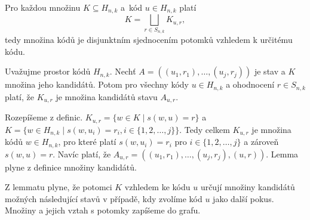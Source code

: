 \begin{lemma}\label{lemmadisjunktnipotomci}
    Pro každou množinu $K \subseteq H_{n,k}$ a~kód $u \in H_{n,k}$ platí
    \[K = \bigsqcup_{r\in S_{n,k}} K_{u,r},\]
    tedy množina kódů je disjunktním sjednocením potomků vzhledem k určitému kódu.
\end{lemma}



\begin{lemma}\label{lemmavztahnaslednikuapotomku}
    Uvažujme prostor kódů $H_{n,k}$. Nechť $A = \left((u_1, r_1), \dots, (u_j,r_j)\right)$ je stav a $K$ množina jeho kandidátů. Potom pro všechny kódy $u\in H_{n,k}$ a ohodnocení $r \in S_{n,k}$ platí, že $K_{u,r}$ je množina kandidátů stavu $A_{u,r}$.
\end{lemma}
\begin{dukaz}
    Rozepíšeme z definic. 
    $K_{u,r} = \{w \in K \mid s(w,u) = r\}$ a $K = \{w \in H_{n,k} \mid s(w,u_i) = r_i,  i \in \{1,2,\dots ,j\} \}$. Tedy celkem 
    $K_{u,r}$ je množina kódů $w \in H_{n,k}$, pro které platí $s(w,u_i) = r_i$ pro $i \in \{1,2,\dots ,j\}$ a zároveň $s(w,u) = r$.
    Navíc platí, že $A_{u,r} = \left((u_1, r_1), \dots, (u_j,r_j), (u,r)\right)$. Lemma plyne z definice množiny kandidátů.
\end{dukaz}
Z lemmatu plyne, že potomci $K$ vzhledem ke kódu $u$ určují množiny kandidátů možných následující stavů v případě, kdy zvolíme kód $u$ jako další pokus. Množiny a jejich vztah s potomky zapíšeme do grafu. 

